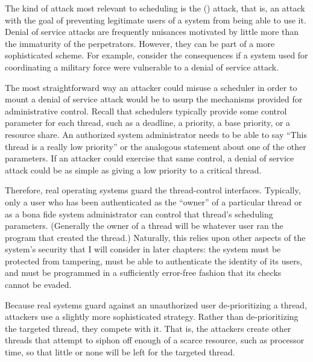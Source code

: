 The kind of attack most relevant to
scheduling is the  () attack, that is, an
attack with the goal of preventing legitimate users of a system from
being able to use it.  Denial of service attacks are frequently
nuisances motivated by little more than the immaturity of the
perpetrators.  However, they can be part of a more sophisticated
scheme.  For example, consider the consequences if a system used for
coordinating a military force were vulnerable to a denial of service
attack.

The most straightforward way an attacker could misuse a scheduler in
order to mount a denial of service attack would be to usurp the
mechanisms provided for administrative control.  Recall that
schedulers typically provide some control parameter for each thread,
such as a deadline, a priority, a base priority, or a resource share.
An authorized system administrator needs to be able to say ``This
thread is a really low priority'' or the analogous statement about
one of the other parameters.  If an attacker could exercise that same
control, a denial of service attack could be as simple as giving a low
priority to a critical thread.

Therefore, real operating systems guard the thread-control interfaces.
Typically, only a user who has been authenticated as the ``owner'' of
a particular thread or as a bona fide system administrator can control
that thread's scheduling parameters.
(Generally the owner of a thread will be whatever user ran the program
that created the thread.)
Naturally, this relies upon
other aspects of the system's security that I will consider in later
chapters: the system must be protected from tampering, must be able to
authenticate the identity of its users, and must be programmed in a
sufficiently error-free fashion that its checks cannot be evaded.

Because real systems guard against an unauthorized user
de-prioritizing a thread, attackers use a slightly more sophisticated
strategy.  Rather than de-prioritizing the targeted thread, they
compete with it.  That is, the attackers create other threads that
attempt to siphon off enough of a scarce resource, such as processor
time, so that little or none will be left for the targeted thread.

